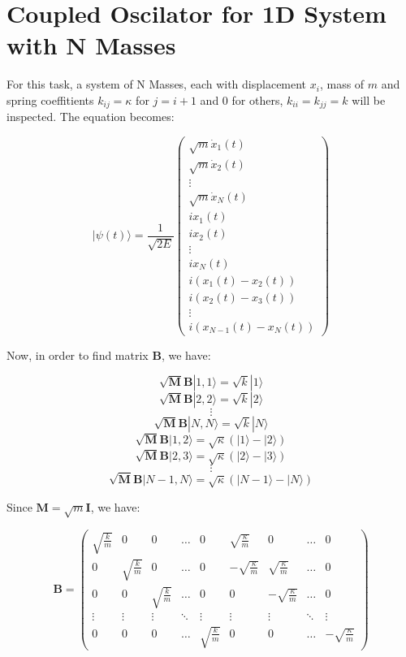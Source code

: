 \documentclass{article}
\begin{document}
\section*{Coupled Oscilator for 1D System with N Masses}

For this task, a system of N Masses, each with displacement $x_i$, mass of $m$ and spring coeffitients $k_{ij} = \kappa$ for $j = i+1$ and $0$ for others, $k_{ii} = k_{jj} = k$ will be inspected. The equation becomes:

$$| \psi(t) \rangle = \frac{1}{\sqrt{2E}}\begin{pmatrix}
    \sqrt{m}\dot{x}_1(t) \\
    \sqrt{m}\dot{x}_2(t) \\
    \vdots \\
    \sqrt{m}\dot{x}_N(t) \\
    ix_1(t) \\
    ix_2(t) \\
    \vdots \\
    ix_N(t) \\
    i(x_1(t) - x_2(t))\\
    i(x_2(t) - x_3(t))\\
    \vdots \\
    i(x_{N-1}(t) - x_N(t))
\end{pmatrix}$$

Now, in order to find matrix $\textbf{B}$, we have:

$$\sqrt{\textbf{M}}\textbf{B}|1,1\rangle = \sqrt{k}|1\rangle$$
$$\sqrt{\textbf{M}}\textbf{B}|2,2\rangle = \sqrt{k}|2\rangle$$
$$\vdots$$
$$\sqrt{\textbf{M}}\textbf{B}|N,N\rangle = \sqrt{k}|N\rangle$$
$$\sqrt{\textbf{M}}\textbf{B}|1,2\rangle = \sqrt{\kappa}(|1\rangle - |2\rangle)$$
$$\sqrt{\textbf{M}}\textbf{B}|2,3\rangle = \sqrt{\kappa}(|2\rangle - |3\rangle)$$
$$\vdots$$
$$\sqrt{\textbf{M}}\textbf{B}|N-1,N\rangle = \sqrt{\kappa}(|N-1\rangle - |N\rangle)$$

Since $\textbf{M} = \sqrt{m}\textbf{I}$, we have:

$$\textbf{B} = \begin{pmatrix}
    \sqrt{\frac{k}{m}} & 0 & 0 & \dots & 0 & \sqrt{\frac{\kappa}{m}} & 0 & \dots & 0 \\
    0 & \sqrt{\frac{k}{m}} & 0 & \dots & 0 & -\sqrt{\frac{\kappa}{m}} & \sqrt{\frac{\kappa}{m}} & \dots & 0 \\
    0 & 0 & \sqrt{\frac{k}{m}} & \dots & 0 & 0 & -\sqrt{\frac{\kappa}{m}} & \dots & 0 \\
    \vdots & \vdots & \vdots & \ddots & \vdots & \vdots & \vdots & \ddots & \vdots \\
    0 & 0 & 0 & \dots & \sqrt{\frac{k}{m}} & 0 & 0 & \dots & -\sqrt{\frac{\kappa}{m}}
\end{pmatrix}$$
\end{document}
